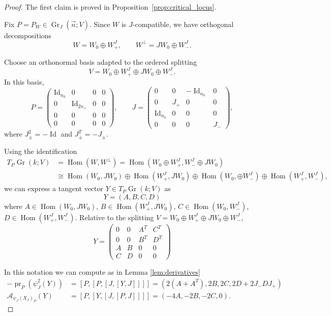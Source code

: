 \documentclass[12pt, final]{article}
\def\A{\mathcal{A}}
\def\pr{\operatorname{pr}}
\def\Hom{\operatorname{Hom}}
\def\Gr{\operatorname{Gr}}
\def\Id{\operatorname{Id}}
\begin{document}
\begin{proof}
The first claim is proved in Proposition~\ref{prop:critical_locus}. 

Fix $P=P_W\in \Gr_J(\vec n;V)$. Since $W$ is $J$-compatible, we have orthogonal decompositions
\[
W=W_0\oplus W_+^J,\qquad W^\perp=JW_0\oplus W_-^J.
\]

\smallskip
Choose an orthonormal basis adapted to the ordered splitting
\[
V = W_0\oplus W_+^J\oplus JW_0\oplus W_-^J.
\]
In this basis,
\[
P=
\begin{pmatrix}
\Id_{n_0} & 0 & 0 & 0\\
0 & \Id_{2n_+} & 0 & 0\\
0 & 0 & 0 & 0\\
0 & 0 & 0 & 0
\end{pmatrix},
\qquad
J=
\begin{pmatrix}
0 & 0 & -\Id_{n_0} & 0\\
0 & J_+ & 0 & 0\\
\Id_{n_0} & 0 & 0 & 0\\
0 & 0 & 0 & J_-
\end{pmatrix},
\]
where $J_\pm^2=-\Id$ and $J_\pm^T=-J_\pm$. 
\smallskip

Using the identification
\begin{align*}
    T_P\Gr(k; V) &= \Hom(W, W^\perp) = \Hom(W_0 \oplus W_+^J, W_-^J\oplus JW_0)\\ &\cong \Hom(W_0, JW_0) \oplus \Hom(W_+^J, JW_0) \oplus \Hom(W_0, \oplus W_-^J) \oplus \Hom(W_+^J, W_-^J),
\end{align*}
we can express a tangent vector $Y \in T_P\Gr(k; V)$ as
\[ Y = (A, B, C, D)\]
where $A\in\Hom(W_0,JW_0)$, $B\in\Hom(W_+^J,JW_0)$, $C\in\Hom(W_0,W_-^J)$, $D\in\Hom(W_+^J,W_-^J)$.
Relative to the splitting $V=W_0\oplus W_+^J\oplus JW_0\oplus W_-^J$,
\[
Y=
\begin{pmatrix}
0 & 0 & A^T & C^T\\
0 & 0 & B^T & D^T\\ 
A & B & 0 & 0\\
C & D & 0 & 0
\end{pmatrix}
\]

\smallskip

In this notation we can compute as in Lemma \ref{lem:derivatives}
\begin{align*}
 -\pr_P(\psi_J^2(Y)) &= [P, [P, [J, [Y, J]]]] = (2(A + A^T), 2B, 2C, 2D + 2J_- D J_+)\\
\A_{\psi_J(X_J)_P}(Y) &= [P, [Y, [J, [P, J]]]] = (-4A, -2B, -2C, 0).\end{align*}


\end{proof}
\end{document}
